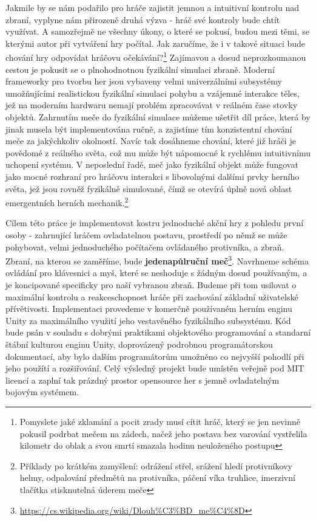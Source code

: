 Jakmile by se nám podařilo pro hráče zajistit jemnou a intuitivní kontrolu nad zbraní, vyplyne nám přirozeně druhá výzva - hráč své kontroly bude chtít využívat. A samozřejmě ne všechny úkony, o které se pokusí, budou mezi těmi, se kterými autor při vytváření hry počítal. Jak zaručíme, že i v takové situaci bude chování hry odpovídat hráčovu očekávání?\footnote{Pomyslete jaké zklamání a pocit zrady musí cítit hráč, který se jen nevinně pokusil podrbat mečem na zádech, načež jeho postava bez varování vystřelila kilometr do oblak a svou smrtí smazala hodinu neuloženého postupu} Zajímavou a dosud neprozkoumanou cestou je pokusit se o plnohodnotnou fyzikální simulaci zbraně. Moderní frameworky pro tvorbu her jsou vybaveny velmi univerzálními subsystémy umožňujícími realistickou fyzikální simulaci pohybu a vzájemné interakce těles, jež na moderním hardwaru nemají problém zpracovávat v reálném čase stovky objektů. Zahrnutím meče do fyzikální simulace můžeme ušetřit díl práce, která by jinak musela být implementována ručně, a zajistíme tím konzistentní chování meče za jakýchkoliv okolností. Navíc tak dosáhneme chování, které již hráči je povědomé z reálného světa, což mu může být nápomocné k rychlému intuitivnímu uchopení systému. V neposlední řadě, meč jako fyzikální objekt může fungovat jako mocné rozhraní pro hráčovu interakci s libovolnými dalšími prvky herního světa, jež jsou rovněž fyzikálně simulované, čímž se otevírá úplně nová oblast emergentních herních mechanik.\footnote{Příklady po krátkém zamyšlení: odrážení střel, srážení hledí protivníkovy helmy, odpalování předmětů na protivníka, páčení víka truhlice, imerzivní tlačítka stisknutelná úderem meče}

Cílem této práce je implementovat kostru jednoduché akční hry z pohledu první osoby - zahrnující hráčem ovladatelnou postavu, prostředí po němž se může pohybovat, velmi jednoduchého počítačem ovládaného protivníka, a zbraň. Zbraní, na kterou se zaměříme, bude \textbf{jedenapůlruční meč}\footnote{\url{https://cs.wikipedia.org/wiki/Dlouh\%C3\%BD_me\%C4\%8D}}. Navrhneme schéma ovládání pro klávesnici a myš, které se neshoduje s žádným dosud používaným, a je koncipované specificky pro naší vybranou zbraň. Budeme při tom usilovat o maximální kontrolu a reakceschopnost hráče při zachování základní uživatelské přívětivosti. Implementaci provedeme v komerčně používaném herním enginu Unity \cite{Unity} za maximálního využití jeho vestavěného fyzikálního subsystému. Kód bude psán v souladu s dobrými praktikami objektového programování a standarní štábní kulturou enginu Unity, doprovázený podrobnou programátorskou dokumentací, aby bylo dalším programátorům umožněno co nejvyšší pohodlí při jeho použítí a rozšiřování. Celý výsledný projekt bude umístěn veřejně pod MIT licencí a zaplní tak prázdný prostor opensource her s jemně ovladatelným bojovým systémem.

